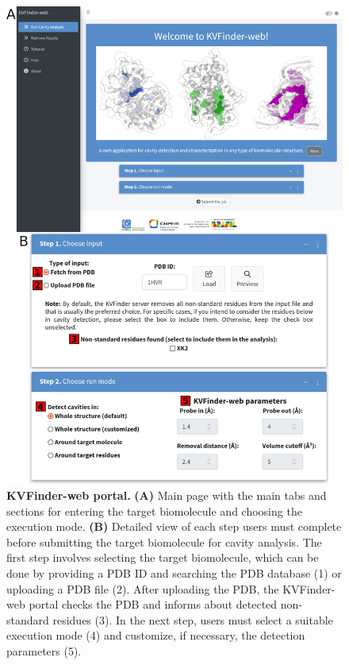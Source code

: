 \documentclass[Ingles]{phdthesis}
\begin{document}
\begin{figure}[H]
  \centering
  \includegraphics[scale=1]{images/kvweb-interface.png}
  \caption[KVFinder-web portal]{\textbf{KVFinder-web portal.} \textbf{(A)} Main page with the main tabs and sections for entering the target biomolecule and choosing the execution mode. \textbf{(B)} Detailed view of each step users must complete before submitting the target biomolecule for cavity analysis. The first step involves selecting the target biomolecule, which can be done by providing a PDB ID and searching the PDB database (1) or uploading a PDB file (2). After uploading the PDB, the KVFinder-web portal checks the PDB and informs about detected non-standard residues (3). In the next step, users must select a suitable execution mode (4) and customize, if necessary, the detection parameters (5).}
  \label{fig:kvweb-interface}
\end{figure}
\end{document}
